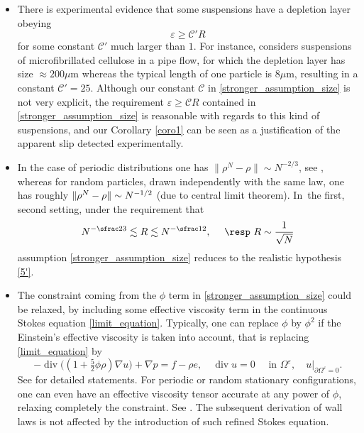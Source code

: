 \documentclass[10pt]{amsart}
\renewcommand{\div}{\operatorname{div}}
\theoremstyle{plain}
\theoremstyle{definition}
\let\pa\partial
\let\na\nabla
\let\eps\varepsilon
\begin{document}
\begin{itemize}
\item There is experimental evidence that some suspensions have a depletion layer obeying
\begin{equation} \label{5'} \tag{5'}
\eps \geq \mathcal{C'} R
\end{equation}
for some constant $\mathcal{C}' $ much larger than $1$. For instance, \cite{Koponen} considers suspensions of microfibrillated cellulose in a pipe flow, for which the depletion layer has size $\approx 200 \mu \mathrm{m}$ whereas the typical length of one particle is $8 \mu \mathrm{m}$, resulting in a constant $\mathcal{C'} = 25$. Although our constant $\mathcal{C}$ in \eqref{stronger_assumption_size} is not very explicit, the requirement $\eps \ge \mathcal{C} R$ contained in \eqref{stronger_assumption_size} is reasonable with regards to this kind of suspensions, and our Corollary \ref{coro1} can be seen as a justification of the apparent slip detected experimentally.
\item In the case of periodic distributions one has $\|\rho^N-\rho\| \sim N^{-2/3}$, see \cite{HillairetHoefer23}, whereas for random particles, drawn independently with the same law, one has roughly $\|\rho^N-\nobreak\rho\| \sim N^{-1/2}$ (due to central limit theorem). In~the first, \resp second setting, under the requirement that
\[
N^{-\sfrac23} \lesssim R \lesssim N^{-\sfrac12}, \quad \text{ \resp } R \sim \frac{1}{\sqrt{N}}
\]
assumption \eqref{stronger_assumption_size} reduces to the realistic hypothesis \eqref{5'}.
\item The constraint coming from the $\phi$ term in \eqref{stronger_assumption_size} could be relaxed, by including some effective viscosity term in the continuous Stokes equation \eqref{limit_equation}. Typically, one can replace $\phi$ by $\phi^2$ if the Einstein's effective viscosity is taken into account, that is replacing \eqref{limit_equation} by
\[
-\div\bigl((1+ \tfrac52 \phi \rho) \na u \bigr) + \na p = f - \rho e, \quad \div u = 0 \quad \text{ in } \Omega^\eps, \quad u\vert_{\pa \Omega^\eps = 0}.
\]
See \cite{Hofer&Schubert} for detailed statements. For periodic or random stationary configurations, one can even have an effective viscosity tensor accurate at any power of $\phi$, relaxing completely the constraint. See \cite{DuerinckxGloria19}. The subsequent derivation of wall laws is not affected by the introduction of such refined Stokes equation.
\end{itemize}
\end{document}
